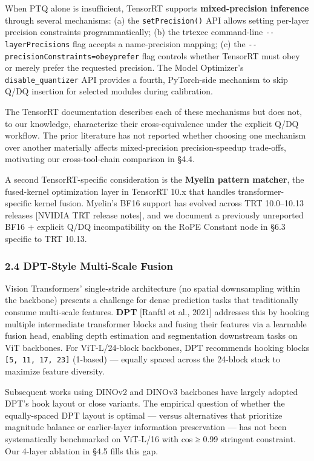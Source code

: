 \documentclass[
]{article}
\begin{document}
When PTQ alone is insufficient, TensorRT supports
\textbf{mixed-precision inference} through several mechanisms: (a) the
\texttt{setPrecision()} API allows setting per-layer precision
constraints programmatically; (b) the trtexec command-line
\texttt{-\/-layerPrecisions} flag accepts a name-precision mapping; (c)
the \texttt{-\/-precisionConstraints=obey\textbar{}prefer} flag controls
whether TensorRT must obey or merely prefer the requested precision. The
Model Optimizer's \texttt{disable\_quantizer} API provides a fourth,
PyTorch-side mechanism to skip Q/DQ insertion for selected modules
during calibration.

The TensorRT documentation describes each of these mechanisms but does
not, to our knowledge, characterize their cross-equivalence under the
explicit Q/DQ workflow. The prior literature has not reported whether
choosing one mechanism over another materially affects mixed-precision
precision-speedup trade-offs, motivating our cross-tool-chain comparison
in §4.4.

A second TensorRT-specific consideration is the \textbf{Myelin pattern
matcher}, the fused-kernel optimization layer in TensorRT 10.x that
handles transformer-specific kernel fusion. Myelin's BF16 support has
evolved across TRT 10.0--10.13 releases {[}NVIDIA TRT release notes{]},
and we document a previously unreported BF16 + explicit Q/DQ
incompatibility on the RoPE Constant node in §6.3 specific to TRT 10.13.

\subsubsection{2.4 DPT-Style Multi-Scale
Fusion}\label{dpt-style-multi-scale-fusion}

Vision Transformers' single-stride architecture (no spatial downsampling
within the backbone) presents a challenge for dense prediction tasks
that traditionally consume multi-scale features. \textbf{DPT} {[}Ranftl
et al., 2021{]} addresses this by hooking multiple intermediate
transformer blocks and fusing their features via a learnable fusion
head, enabling depth estimation and segmentation downstream tasks on ViT
backbones. For ViT-L/24-block backbones, DPT recommends hooking blocks
\texttt{{[}5,\ 11,\ 17,\ 23{]}} (1-based) --- equally spaced across the
24-block stack to maximize feature diversity.

Subsequent works using DINOv2 and DINOv3 backbones have largely adopted
DPT's hook layout or close variants. The empirical question of whether
the equally-spaced DPT layout is optimal --- versus alternatives that
prioritize magnitude balance or earlier-layer information preservation
--- has not been systematically benchmarked on ViT-L/16 with cos ≥ 0.99
stringent constraint. Our 4-layer ablation in §4.5 fills this gap.
\end{document}
